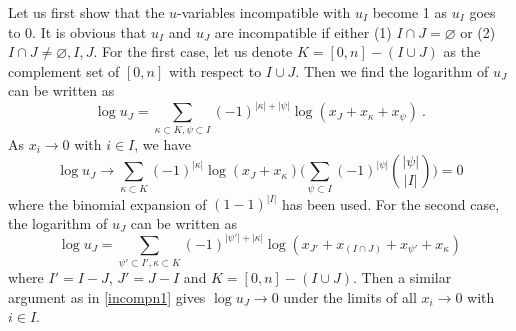 \documentclass[hidelinks,12pt]{article}
\begin{document}
Let us first show that the $u$-variables incompatible with $u_{I}$ become 1 as $u_{I}$ goes to 0. It is obvious that $u_{I}$ and $u_{J}$ are incompatible if either (1) $I\cap J=  \varnothing$  or (2) $I\cap J \neq \varnothing,I, J $. For the first case, let us denote $K=[0,n]-(I\cup J)$ as the complement set of $[0,n]$ with respect to $I\cup J$. Then we find the logarithm of $u_{J}$ can be written as 
\begin{equation}
     \log u_{J} = \sum_{\kappa\subset K,\psi\subset I} (-1)^{\lvert\kappa\rvert+\lvert \psi\rvert }\log (x_{J}+x_{ \kappa} +x_{ \psi} )\:. \label{1incompuvarforPn}
\end{equation}
As $x_{i}\to 0$ with $i\in I$, we have 
\begin{equation}
   \log u_{J} \to \sum_{\kappa\subset K} (-1)^{\lvert \kappa\rvert } \log (x_{J}+x_{ \kappa})\Biggl(\sum_{\psi\subset I}(-1)^{\lvert\psi\rvert}\binom{\lvert \psi \rvert }{\lvert I \rvert }\Biggr)=0 \label{incompn1}
\end{equation}
where the binomial expansion of $(1-1)^{\lvert I \rvert}$ has been used. For the second case, the logarithm of $u_{J}$ can be written as 
\begin{equation}
   \log u_{J} = \sum_{\psi'\subset I',\kappa\subset K}(-1)^{\lvert \psi' \rvert+ \lvert \kappa\rvert}  \log (x_{J'}+ x_{(I\cap J)}+x_{ \psi'}+x_{\kappa })
\end{equation}
where $I'=I-J$, $J'=J-I$ and $K=[0,n]-(I\cup J)$. Then a similar argument as in \eqref{incompn1} gives $\log u_{J}\to 0$ under the limits of all $x_{i}\to 0$ with $i\in I$.
\end{document}

